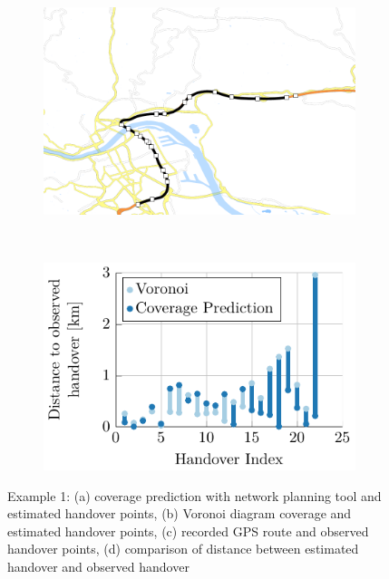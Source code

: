 \begin{figure}
	\begin{subfigure}[b]{0.5\linewidth}
			\includegraphics[width=\textwidth]{./images/563_Handover}
			\caption{}
			\label{fig:563handover}
		\end{subfigure}%
		~
		\begin{subfigure}[b]{0.5\linewidth}
			\centering
			\includegraphics[width=\textwidth]{./images/563_predvorcomp}
			\caption{}
			\label{fig:563distcomp}
		\end{subfigure}

	\caption{Example 1: (a) coverage prediction with network planning tool and estimated handover points, (b) Voronoi diagram coverage and estimated handover points, (c) recorded GPS route and observed handover points, (d) comparison of distance between estimated handover and observed handover}\label{fig:563overview}
\end{figure}


